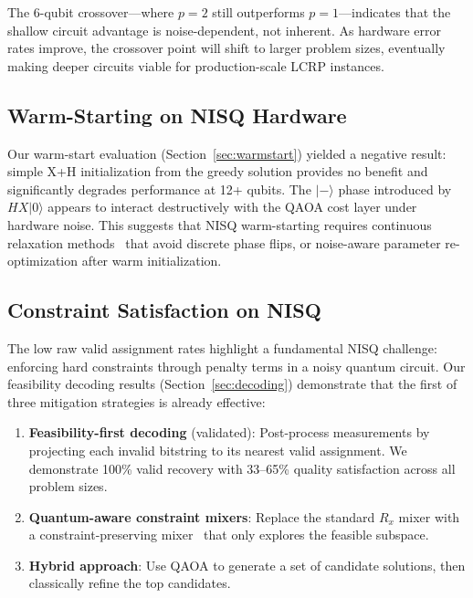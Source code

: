 \documentclass[conference]{IEEEtran}
\begin{document}
The 6-qubit crossover---where $p\!=\!2$ still outperforms $p\!=\!1$---indicates that the shallow circuit advantage is noise-dependent, not inherent. As hardware error rates improve, the crossover point will shift to larger problem sizes, eventually making deeper circuits viable for production-scale LCRP instances.

\subsection{Warm-Starting on NISQ Hardware}

Our warm-start evaluation (Section~\ref{sec:warmstart}) yielded a negative result: simple X+H initialization from the greedy solution provides no benefit and significantly degrades performance at 12+ qubits. The $|-\rangle$ phase introduced by $HX|0\rangle$ appears to interact destructively with the QAOA cost layer under hardware noise. This suggests that NISQ warm-starting requires continuous relaxation methods~\cite{egger2021warmstart} that avoid discrete phase flips, or noise-aware parameter re-optimization after warm initialization.

\subsection{Constraint Satisfaction on NISQ}

The low raw valid assignment rates highlight a fundamental NISQ challenge: enforcing hard constraints through penalty terms in a noisy quantum circuit. Our feasibility decoding results (Section~\ref{sec:decoding}) demonstrate that the first of three mitigation strategies is already effective:

\begin{enumerate}
    \item \textbf{Feasibility-first decoding} (validated): Post-process measurements by projecting each invalid bitstring to its nearest valid assignment. We demonstrate 100\% valid recovery with 33--65\% quality satisfaction across all problem sizes.
    \item \textbf{Quantum-aware constraint mixers}: Replace the standard $R_x$ mixer with a constraint-preserving mixer~\cite{hadfield2019qaoa} that only explores the feasible subspace.
    \item \textbf{Hybrid approach}: Use QAOA to generate a set of candidate solutions, then classically refine the top candidates.
\end{enumerate}
\end{document}
